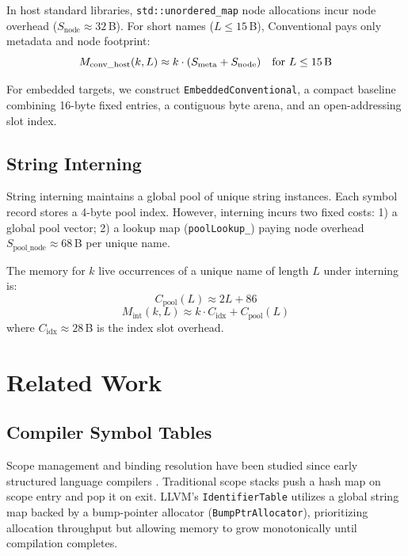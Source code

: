 \documentclass[conference]{IEEEtran}
\begin{document}
In host standard libraries, \texttt{std::unordered\_map} node allocations incur node overhead ($S_{\text{node}} \approx 32$\,B). For short names ($L \le 15$\,B), Conventional pays only metadata and node footprint:
\begin{equation}
M_{\text{conv\_host}}(k, L) \approx k \cdot (S_{\text{meta}} + S_{\text{node}}) \quad \text{for } L \le 15\text{\,B}
\end{equation}

For embedded targets, we construct \texttt{EmbeddedConventional}, a compact baseline combining 16-byte fixed entries, a contiguous byte arena, and an open-addressing slot index.

\subsection{String Interning}
String interning maintains a global pool of unique string instances. Each symbol record stores a 4-byte pool index. However, interning incurs two fixed costs: 1) a global pool vector; 2) a lookup map (\texttt{poolLookup\_}) paying node overhead $S_{\text{pool\_node}} \approx 68$\,B per unique name.

The memory for $k$ live occurrences of a unique name of length $L$ under interning is:
\begin{equation}
C_{\text{pool}}(L) \approx 2L + 86
\end{equation}
\begin{equation}
M_{\text{int}}(k, L) \approx k \cdot C_{\text{idx}} + C_{\text{pool}}(L)
\end{equation}
where $C_{\text{idx}} \approx 28$\,B is the index slot overhead.

\section{Related Work}

\subsection{Compiler Symbol Tables}
Scope management and binding resolution have been studied since early structured language compilers \cite{aho, hanson1980fast, reiss1983practical}. Traditional scope stacks push a hash map on scope entry and pop it on exit. LLVM's \texttt{IdentifierTable} \cite{lattner2004llvm} utilizes a global string map backed by a bump-pointer allocator (\texttt{BumpPtrAllocator}), prioritizing allocation throughput but allowing memory to grow monotonically until compilation completes.
\end{document}

